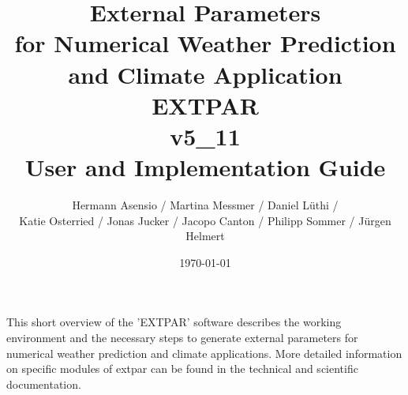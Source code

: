 \documentclass[a4paper,10pt,DIV14,BCOR1cm,titlepage,twoside]{scrartcl}
\title{External Parameters \\ 
for Numerical Weather Prediction 
and Climate Application \\
EXTPAR\\
v5\_11 \\
User and Implementation Guide}
\author{
  Hermann Asensio / Martina Messmer / Daniel L\"uthi / \\
  Katie Osterried / Jonas Jucker / Jacopo Canton / Philipp Sommer / J\"urgen Helmert
}
\date{\today}
\begin{document}
  

\renewcommand{\thefootnote}{\fnsymbol{footnote}}  

\maketitle  
\renewcommand{\thefootnote}{\arabic{footnote}}  

\cleardoublepage

\tableofcontents

\cleardoublepage


\noindent This short overview of the 'EXTPAR' software describes the working environment and the necessary steps to generate external parameters for numerical weather prediction and climate applications. More detailed information on specific modules of extpar can be found in the technical and scientific documentation.\par\medskip\noindent
\end{document}

